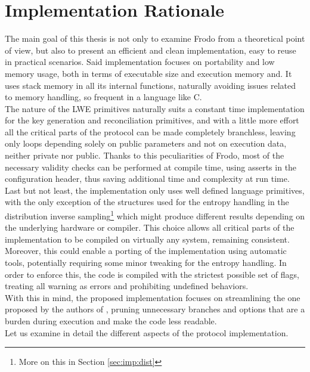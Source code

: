 \section{Implementation Rationale}
The main goal of this thesis is not only to examine Frodo from a theoretical point of view, but also to present an efficient and clean implementation, easy to reuse in practical scenarios. Said implementation focuses on portability and low memory usage, both in terms of executable size and execution memory and. It uses stack memory in all its internal functions, naturally avoiding issues related to memory handling, so frequent in a language like C.\\
The nature of the LWE primitives naturally suits a constant time implementation for the key generation and reconciliation primitives, and with a little more effort all the critical parts of the protocol can be made completely branchless, leaving only loops depending solely on public parameters and not on execution data, neither private nor public. Thanks to this peculiarities of Frodo, most of the necessary validity checks can be performed at compile time, using asserts in the configuration header, thus saving additional time and complexity at run time.\\
Last but not least, the implementation only uses well defined language primitives, with the only exception of the structures used for the entropy handling in the distribution inverse sampling\footnote{More on this in Section \ref{sec:imp:dist}} which might produce different results depending on the underlying hardware or compiler. This choice allows all critical parts of the implementation to be compiled on virtually any system, remaining consistent. Moreover, this could enable a porting of the implementation using automatic tools, potentially requiring some minor tweaking for the entropy handling. In order to enforce this, the code is compiled with the strictest possible set of flags, treating all warning as errors and prohibiting undefined behaviors.\\
With this in mind, the proposed implementation focuses on streamlining the one proposed by the authors of \cite{frodo}, pruning unnecessary branches and options that are a burden during execution and make the code less readable.\\
Let us examine in detail the different aspects of the protocol implementation.

